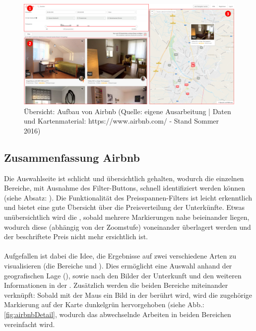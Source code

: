 \documentclass[../Bachelorarbeit.tex]{subfiles}
\begin{document}
\begin{figure}[H]
	\centering
	\includegraphics[width=1\linewidth]{img/StandDerTechnik/airbnbOverview}
	\caption[Übersicht: Aufbau von Airbnb]{Übersicht: Aufbau von Airbnb (Quelle: eigene Ausarbeitung | Daten und Kartenmaterial: https://www.airbnb.com/ - Stand Sommer 2016)}
	\label{fig:airbnbOverview}
\end{figure}

\subsection{Zusammenfassung Airbnb}
\label{airbnb:review}
Die Auswahlseite ist schlicht und übersichtlich gehalten, wodurch die einzelnen Bereiche, mit Ausnahme des Filter-Buttons, schnell identifiziert werden können (siehe Absatz: ). 
Die Funktionalität des Preisspannen-Filters ist leicht erkenntlich und bietet eine gute Übersicht über die Preisverteilung der Unterkünfte.
Etwas unübersichtlich wird die , sobald mehrere Markierungen nahe beieinander liegen, wodurch diese (abhängig von der Zoomstufe) voneinander überlagert werden und der beschriftete Preis nicht mehr ersichtlich ist. \\
\\
Aufgefallen ist dabei die Idee, die Ergebnisse auf zwei verschiedene Arten zu visualisieren (die Bereiche  und ).
Dies ermöglicht eine Auswahl anhand der geografischen Lage (), sowie nach den Bilder der Unterkunft und den weiteren Informationen in der .
Zusätzlich werden die beiden Bereiche miteinander verknüpft: Sobald mit der Maus ein Bild in der  berührt wird, wird die zugehörige Markierung auf der Karte dunkelgrün hervorgehoben (siehe Abb.: \ref{fig:airbnbDetail}, wodurch das abwechselnde Arbeiten in beiden Bereichen vereinfacht wird.
\end{document}

